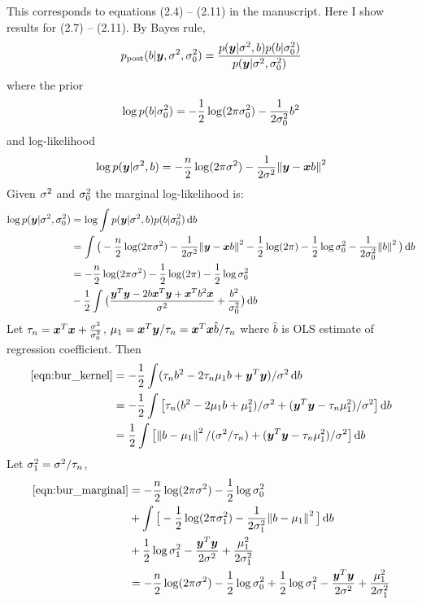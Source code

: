 This corresponds to equations (2.4) -- (2.11) in the manuscript. Here I show results for (2.7) -- (2.11). By Bayes rule,
\begin{equation}
    p_\text{post}(b|\bm y, \sigma^2, \sigma^2_0) = \frac{p(\bm y|\sigma^2,b)p(b|\sigma^2_0)}{p(\bm y|\sigma^2, \sigma^2_0)}
\end{equation}
where the prior
\begin{equation}
    \log p(b|\sigma^2_0) = -\frac{1}{2}\log (2\pi\sigma^2_0) - \frac{1}{2\sigma^2_0}b^2
\end{equation}
and log-likelihood
\begin{equation}
\log p(\bm y|\sigma^2, b) = -\frac{n}{2}\log(2\pi\sigma^2) - \frac{1}{2\sigma^2}\norm{\bm y - \bm x b}^2
\end{equation}
Given $\sigma^2$ and $\sigma^2_0$ the marginal log-likelihood is:
\begin{align}
    \log p(\vy|\rv, \rv_0) &= \log \int p(\vy|\rv, b) p(b|\rv_0)\dif b \label{eqn:bur_marginal}\\
    & = \int \big(-\frac{n}{2} \log(2\pi\rv) - \frac{1}{2\rv}\norm{\vy-\vx b}^2 - \frac{1}{2}\log(2\pi) - \frac{1}{2}\log\rv_0 - \frac{1}{2\rv_0}\norm{b}^2\big)\dif b \\
    & = -\frac{n}{2}\log (2\pi\rv) - \frac{1}{2}\log(2\pi) - \frac{1}{2}\log \rv_0 \\
    & -\frac{1}{2} \int \big( \frac{\vy^T\vy - 2b\vx^T\vy + \vx^T b^2\vx}{\rv} + \frac{b^2}{\rv_0}\big) \dif b \label{eqn:bur_kernel}
\end{align}
Let $\tau_n = \bm x^T\bm x + \frac{\sigma^2}{\sigma^2_0}$, $\mu_1 = \bm x^T\bm y / \tau_n = \bm x^T\bm x \hat{b} / \tau_n$ where $\hat{b}$ is OLS estimate of regression coefficient. Then
\begin{align}
    \eqref{eqn:bur_kernel} &= -\frac{1}{2}\int (\tau_nb^2 - 2\tau_n \mu_1 b + \vy^T\vy) / \rv \dif b \\ 
    &= -\frac{1}{2}\int \big[ \tau_n(b^2 - 2\mu_1 b + \mu_1^2) / \rv + (\vy^T\vy - \tau_n\mu_1^2) / \rv \big] \dif b \\ 
    &= \frac{1}{2} \int \big[\norm{b-\mu_1}^2 / (\rv/\tau_n) + (\vy^T\vy - \tau_n\mu_1^2) / \rv \big] \dif b
\end{align}
Let $\sigma^2_1 = \sigma^2 / \tau_n$, 
\begin{align}
    \eqref{eqn:bur_marginal} &= -\frac{n}{2}\log(2\pi\rv) - \frac{1}{2} \log \rv_0 \\
    &+ \int \big[-\frac{1}{2} \log(2\pi\rv_1) - \frac{1}{2\rv_1}\norm{b-\mu_1}^2 \big] \dif b \\
    &+ \frac{1}{2}\log \rv_1 - \frac{\vy^T\vy}{2\rv} + \frac{\mu_1^2}{2\rv_1} \\
    &= -\frac{n}{2}\log(2\pi\rv) - \frac{1}{2} \log \rv_0 + \frac{1}{2}\log \rv_1 - \frac{\vy^T\vy}{2\rv} + \frac{\mu_1^2}{2\rv_1} \label{eqn:bur_marginal_result}
\end{align}
